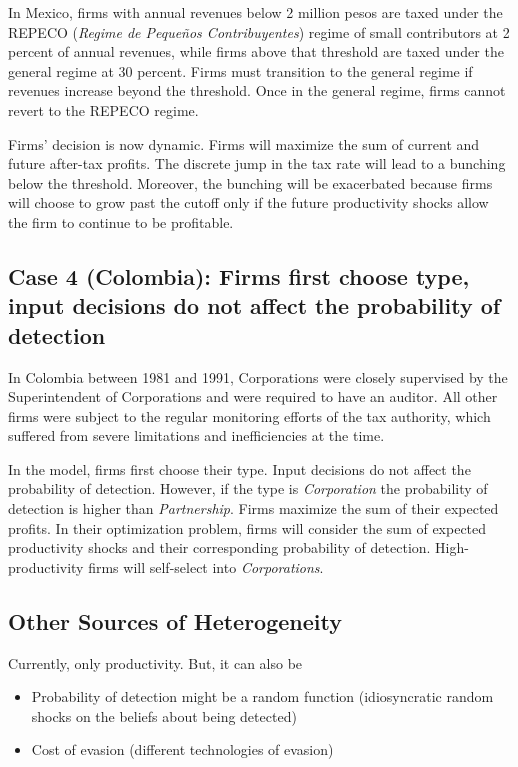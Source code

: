 \documentclass[
  12pt]{article}
\providecommand{\tightlist}{%
  \setlength{\itemsep}{0pt}\setlength{\parskip}{0pt}}\usepackage{longtable,booktabs,array}
\begin{document}
In Mexico, firms with annual revenues below 2 million pesos are taxed
under the REPECO (\emph{Regime de Pequeños Contribuyentes}) regime of
small contributors at 2 percent of annual revenues, while firms above
that threshold are taxed under the general regime at 30 percent. Firms
must transition to the general regime if revenues increase beyond the
threshold. Once in the general regime, firms cannot revert to the REPECO
regime.

Firms' decision is now dynamic. Firms will maximize the sum of current
and future after-tax profits. The discrete jump in the tax rate will
lead to a bunching below the threshold. Moreover, the bunching will be
exacerbated because firms will choose to grow past the cutoff only if
the future productivity shocks allow the firm to continue to be
profitable.

\subsection{Case 4 (Colombia): Firms first choose type, input decisions
do not affect the probability of
detection}\label{case-4-colombia-firms-first-choose-type-input-decisions-do-not-affect-the-probability-of-detection}

In Colombia between 1981 and 1991, Corporations were closely supervised
by the Superintendent of Corporations and were required to have an
auditor. All other firms were subject to the regular monitoring efforts
of the tax authority, which suffered from severe limitations and
inefficiencies at the time.

In the model, firms first choose their type. Input decisions do not
affect the probability of detection. However, if the type is
\emph{Corporation} the probability of detection is higher than
\emph{Partnership}. Firms maximize the sum of their expected profits. In
their optimization problem, firms will consider the sum of expected
productivity shocks and their corresponding probability of detection.
High-productivity firms will self-select into \emph{Corporations}.

\subsection{Other Sources of
Heterogeneity}\label{other-sources-of-heterogeneity}

Currently, only productivity. But, it can also be

\begin{itemize}
\tightlist
\item
  Probability of detection might be a random function (idiosyncratic
  random shocks on the beliefs about being detected)
\item
  Cost of evasion (different technologies of evasion)
\end{itemize}
\end{document}

